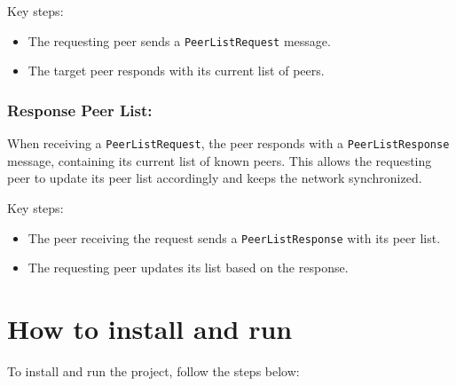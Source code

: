 Key steps:
\begin{itemize}
    \item The requesting peer sends a \texttt{PeerListRequest} message.
    \item The target peer responds with its current list of peers.
\end{itemize}

\subsubsection{Response Peer List:}
When receiving a \texttt{PeerListRequest}, the peer responds with a \texttt{PeerListResponse} message, containing its current list of known peers. This allows the requesting peer to update its peer list accordingly and keeps the network synchronized.

Key steps:
\begin{itemize}
    \item The peer receiving the request sends a \texttt{PeerListResponse} with its peer list.
    \item The requesting peer updates its list based on the response.
\end{itemize}



\section{How to install and run}
To install and run the project, follow the steps below:

